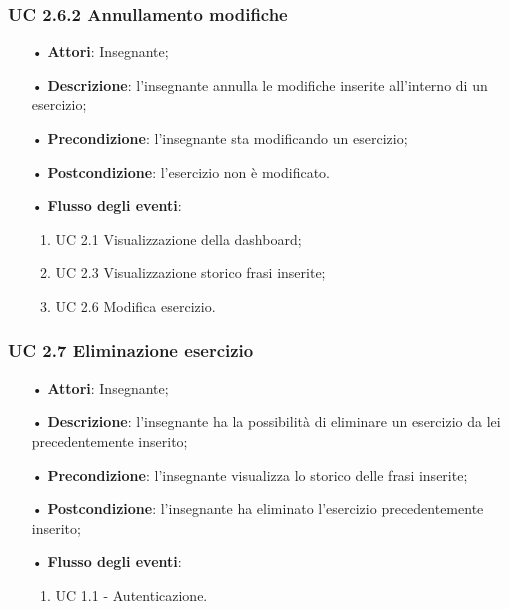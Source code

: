 \subsubsection{UC 2.6.2 Annullamento modifiche}
\begin{itemize}
	\item[•] \textbf{Attori}: Insegnante;
	\item[•] \textbf{Descrizione}: l'insegnante annulla le modifiche inserite all'interno di un esercizio; 
	\item[•] \textbf{Precondizione}: l'insegnante sta modificando un esercizio;
	\item[•] \textbf{Postcondizione}: l'esercizio non è modificato.
	\item[•] \textbf{Flusso degli eventi}:
	\begin{enumerate}
		\item UC 2.1 Visualizzazione della dashboard;
		\item UC 2.3 Visualizzazione storico frasi inserite;
		\item UC 2.6 Modifica esercizio.
	\end{enumerate}
\end{itemize}

\subsubsection{UC 2.7 Eliminazione esercizio}
\begin{itemize}
	\item[•] \textbf{Attori}: Insegnante;
	\item[•] \textbf{Descrizione}: l'insegnante ha la possibilità di eliminare un esercizio da lei precedentemente inserito;
	\item[•] \textbf{Precondizione}: l'insegnante visualizza lo storico delle frasi inserite;
	\item[•] \textbf{Postcondizione}: l'insegnante ha eliminato l'esercizio precedentemente inserito;
	\item[•] \textbf{Flusso degli eventi}:
		\begin{enumerate}
		\item UC 1.1 - Autenticazione.
		\end{enumerate}
\end{itemize}


